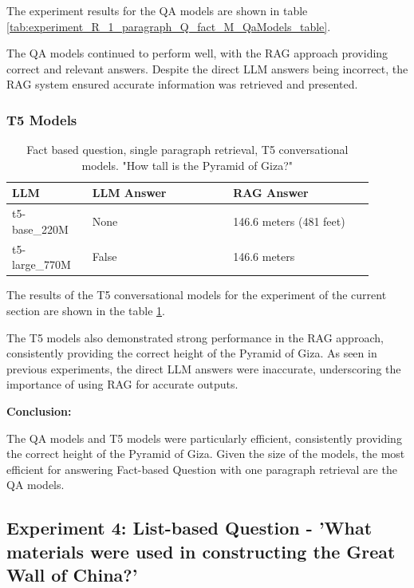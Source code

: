 \documentclass{wseas}
\begin{document}
The experiment results for the QA models are shown in table \ref{tab:experiment_R_1_paragraph_Q_fact_M_QaModels_table}.

The QA models continued to perform well, with the RAG approach providing
correct and relevant answers. Despite the direct LLM answers being
incorrect, the RAG system ensured accurate information was retrieved and
presented.

\subsubsection{T5 Models}


\begin{table}[htbp]
  \caption{Fact based question, single paragraph retrieval, T5 conversational models. "How tall is the Pyramid of Giza?"} %
  \centering
  \label{tab:experiment_R_1_paragraph_Q_fact_M_T5Models_table}
  \begin{tabular}{|p{0.20\linewidth}|p{0.35\linewidth}|p{0.35\linewidth}|}
    \hline
    \textbf{LLM} & \textbf{LLM Answer} & \textbf{RAG Answer} \\ \hline
    t5-base\_220M & None & 146.6 meters (481 feet) \\ \hline
    t5-large\_770M & False & 146.6 meters \\ \hline
  \end{tabular}
\end{table}

The results of the T5 conversational models for the experiment of the current section 
are shown in the table \ref{tab:experiment_R_1_paragraph_Q_fact_M_T5Models_table}.

The T5 models also demonstrated strong performance in the RAG approach,
consistently providing the correct height of the Pyramid of Giza. As
seen in previous experiments, the direct LLM answers were inaccurate,
underscoring the importance of using RAG for accurate outputs.

\textbf{Conclusion:}

The QA models and T5 models were particularly efficient, consistently
providing the correct height of the Pyramid of Giza. Given the size of
the models, the most efficient for answering Fact-based Question with
one paragraph retrieval are the QA models.

\subsection{Experiment 4: List-based Question - 'What materials were
used in constructing the Great Wall of China?'}
\end{document}
